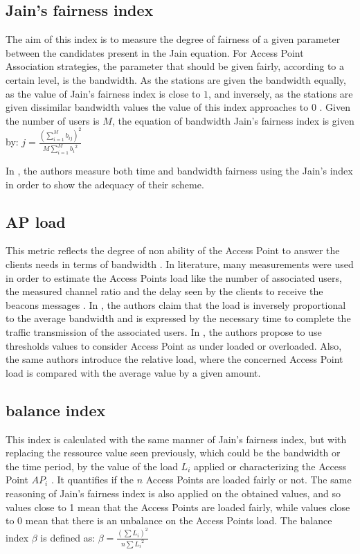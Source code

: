 \documentclass[journal,transmag]{IEEEtran}
\begin{document}
\subsection{Jain's fairness index} 
The aim of this index is to measure the degree of fairness of a given parameter between the candidates present in the Jain equation. For Access Point Association strategies, the parameter that should be given fairly, according to a certain level, is the bandwidth. As the stations are given the bandwidth equally, as the value of Jain's fairness index is close to $1$, and inversely, as the stations are given dissimilar bandwidth values the value of this index approaches to $0$ \cite{14AP_association_multirate_WLAN}.  
Given the number of users is $M$, the equation of bandwidth Jain's fairness index is given by:
$j=\frac{\left(\sum\limits_{i=1}^M b_{ij}\right)^2}{M \sum\limits_{i=1}^M {b_i}^2} $

In \cite{15Demand_aware_load_balance_WLAN,16throughput_optimisation_association_bandwidth}, the authors measure both time and bandwidth fairness using the Jain's index in order to show the adequacy of their scheme.

\subsection{AP load}
This metric reflects the degree of non ability of the Access Point to answer the clients needs in terms of bandwidth \cite{04Fairness_load_balancing_WLAN}. In literature, many measurements were used in order to estimate the Access Points load like the number of associated users, the measured channel ratio and the delay seen by the clients to receive the beacons messages \cite{14online_AP_association_80211n}. In \cite{04Fairness_load_balancing_WLAN,08AP_assignement_algorithms}, the authors claim that the load is inversely proportional to the average bandwidth and is expressed by the necessary time to complete the traffic transmission of the associated users. In \cite{09load_balancing_WLAN}, the authors propose to use thresholds values to consider Access Point as under loaded or overloaded. Also, the same authors introduce the relative load, where the concerned Access Point load is compared with the average value by a given amount.  

\subsection{balance index} 
This index is calculated with the same manner of Jain's fairness index, but with replacing the ressource value seen previously, which could be the bandwidth or the time period, by the value of the load $L_i$ applied or characterizing the Access Point $AP_i$ \cite{09load_balancing_WLAN}. It quantifies if the $n$ Access Points are loaded fairly or not. The same reasoning of Jain's fairness index is also applied on the obtained values, and so values close to 1 mean that the Access Points are loaded fairly, while values close to 0 mean that there is an unbalance on the Access Points load. The balance index $β$ is defined as: $β =\frac{(\sum L_i)^2} {n \sum{L_i}^2}$
\end{document}
